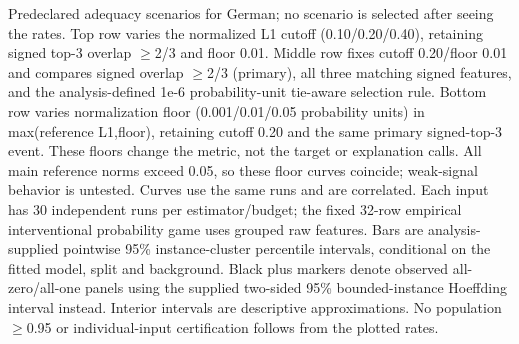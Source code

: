 Predeclared adequacy scenarios for German; no scenario is selected after seeing the rates. Top row varies the normalized L1 cutoff (0.10/0.20/0.40), retaining signed top-3 overlap $\geq$2/3 and floor 0.01. Middle row fixes cutoff 0.20/floor 0.01 and compares signed overlap $\geq$2/3 (primary), all three matching signed features, and the analysis-defined 1e-6 probability-unit tie-aware selection rule. Bottom row varies normalization floor (0.001/0.01/0.05 probability units) in max(reference L1,floor), retaining cutoff 0.20 and the same primary signed-top-3 event. These floors change the metric, not the target or explanation calls. All main reference norms exceed 0.05, so these floor curves coincide; weak-signal behavior is untested. Curves use the same runs and are correlated. Each input has 30 independent runs per estimator/budget; the fixed 32-row empirical interventional probability game uses grouped raw features. Bars are analysis-supplied pointwise 95\% instance-cluster percentile intervals, conditional on the fitted model, split and background. Black plus markers denote observed all-zero/all-one panels using the supplied two-sided 95\% bounded-instance Hoeffding interval instead. Interior intervals are descriptive approximations. No population $\geq$0.95 or individual-input certification follows from the plotted rates.
